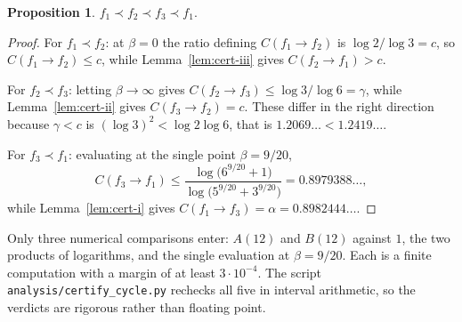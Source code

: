 \documentclass[11pt]{article}
\theoremstyle{definition}
\newtheorem{proposition}{Proposition}
\theoremstyle{remark}
\begin{document}
\begin{proposition}
\label{prop:cycle-certified}
\(f_1\prec f_2\prec f_3\prec f_1\).
\end{proposition}

\begin{proof}
For \(f_1\prec f_2\): at \(\beta=0\) the ratio defining \(C(f_1\to f_2)\) is
\(\log2/\log3=c\), so \(C(f_1\to f_2)\leq c\), while
Lemma~\ref{lem:cert-iii} gives \(C(f_2\to f_1)>c\).

For \(f_2\prec f_3\): letting \(\beta\to\infty\) gives
\(C(f_2\to f_3)\leq\log3/\log6=\gamma\), while Lemma~\ref{lem:cert-ii} gives
\(C(f_3\to f_2)=c\).  These differ in the right direction because
\(\gamma<c\) is \((\log3)^2<\log2\log6\), that is
\(1.2069\ldots<1.2419\ldots\).

For \(f_3\prec f_1\): evaluating at the single point \(\beta=9/20\),
\[
  C(f_3\to f_1)
  \leq\frac{\log\bigl(6^{9/20}+1\bigr)}{\log\bigl(5^{9/20}+3^{9/20}\bigr)}
  =0.8979388\ldots,
\]
while Lemma~\ref{lem:cert-i} gives \(C(f_1\to f_3)=\alpha=0.8982444\ldots\).
\end{proof}

Only three numerical comparisons enter: \(A(12)\) and \(B(12)\) against
\(1\), the two products of logarithms, and the single evaluation at
\(\beta=9/20\).  Each is a finite computation with a margin of at least
\(3\cdot10^{-4}\).  The script \texttt{analysis/certify\_cycle.py} rechecks
all five in interval arithmetic, so the verdicts are rigorous rather than
floating point.
\end{document}
